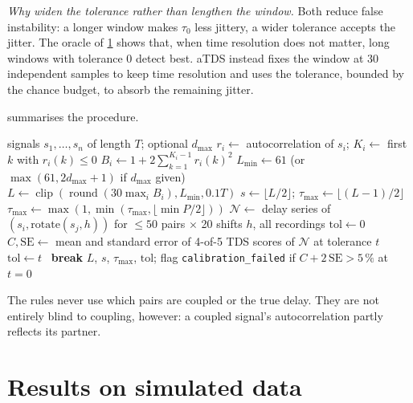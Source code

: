 \documentclass[11pt,a4paper]{article}
\begin{document}
\emph{Why widen the tolerance rather than lengthen the window.} Both reduce false instability: a longer window makes $\tau_0$ less jittery, a wider tolerance accepts the jitter. The oracle of \cref{sec:simulation} shows that, when time resolution does not matter, long windows with tolerance 0 detect best. aTDS instead fixes the window at 30 independent samples to keep time resolution and uses the tolerance, bounded by the chance budget, to absorb the remaining jitter.

 summarises the procedure.

\begin{algorithm}[t]
\caption{aTDS parameter selection}
\label{alg:atds}
\begin{algorithmic}[1]
\Require signals $s_1,\dots,s_n$ of length $T$; optional $d_{\max}$
  \State $r_i \gets$ autocorrelation of $s_i$; \quad $K_i \gets$ first $k$ with $r_i(k)\le 0$
  \State $B_i \gets 1 + 2\sum_{k=1}^{K_i-1} r_i(k)^2$
\EndFor
\State $L_{\min} \gets 61$ (or $\max(61, 2d_{\max}+1)$ if $d_{\max}$ given)
\State $L \gets \operatorname{clip}(\operatorname{round}(30\max_i B_i), L_{\min}, 0.1T)$ 
\State $s \gets \lfloor L/2\rfloor$; \quad $\tau_{\max} \gets \lfloor (L-1)/2 \rfloor$
 $\tau_{\max} \gets \max(1, \min(\tau_{\max}, \lfloor\min P/2\rfloor))$ \EndIf
\State $\mathcal{N} \gets$ delay series of $(s_i, \mathrm{rotate}(s_j, h))$ for $\le 50$ pairs $\times$ 20 shifts $h$, all recordings
\State $\mathrm{tol} \gets 0$
  \State $C, \mathrm{SE} \gets$ mean and standard error of 4-of-5 TDS scores of $\mathcal{N}$ at tolerance $t$
   $\mathrm{tol} \gets t$ \Else\ \textbf{break} \EndIf
\EndFor
\State \Return $L$, $s$, $\tau_{\max}$, $\mathrm{tol}$; flag \texttt{calibration\_failed} if $C + 2\,\mathrm{SE} > 5\,\%$ at $t=0$
\end{algorithmic}
\end{algorithm}

The rules never use which pairs are coupled or the true delay. They are not entirely blind to coupling, however: a coupled signal's autocorrelation partly reflects its partner.


\section{Results on simulated data}
\label{sec:simulation}
\end{document}
